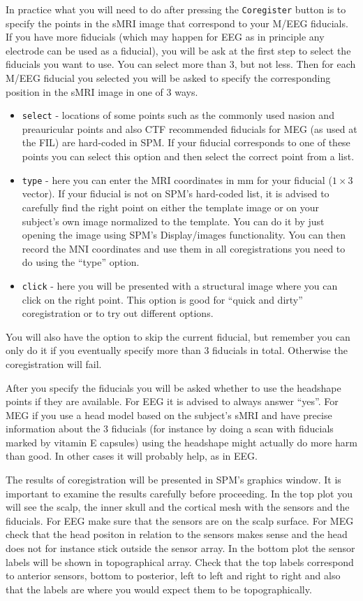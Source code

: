 In practice what you will need to do after pressing  the \texttt{Coregister} button is to specify the points in the sMRI image that correspond to your M/EEG fiducials. If you have more fiducials (which may happen for EEG as in principle any electrode can be used as a fiducial), you will be ask at the first step to select the fiducials you want to use. You can select more than 3, but not less. Then for each M/EEG fiducial you selected you will be asked to specify the corresponding position in the sMRI image in one of 3 ways.

\begin{itemize}
\item \texttt{select} - locations of some points such as the commonly used nasion and preauricular points and also CTF recommended fiducials for MEG (as used at the FIL) are hard-coded in SPM. If your fiducial corresponds to one of these points you can select this option and then select the correct point from a list.
\item \texttt{type} - here you can enter the MRI coordinates in mm for your fiducial ($1 \times 3$ vector). If your fiducial is not on SPM's hard-coded list, it is advised to carefully find the right point on either the template image or on your subject's own image normalized to the template. You can do it by just opening the image using SPM's Display/images functionality. You can then record the MNI coordinates and use them in all coregistrations you need to do using the ``type'' option.
\item \texttt{click} - here you will be presented with a structural image where you can click on the right point. This option is good for ``quick and dirty'' coregistration or to try out different options.
\end{itemize}

You will also have the option to skip the current fiducial, but remember you can only do it if you eventually specify more than 3 fiducials in total. Otherwise the coregistration will fail.

After you specify the fiducials you will be asked whether to use the headshape points if they are available. For EEG it is advised to always answer ``yes''. For MEG if you use a head model based on the subject's sMRI and have precise information about the 3 fiducials (for instance by doing a scan with fiducials marked by vitamin E capsules) using the headshape might actually do more harm than good. In other cases it will probably help, as in EEG.

The results of coregistration will be presented in SPM's graphics window. It is important to examine the results carefully before proceeding. In the top plot you will see the scalp, the inner skull and the cortical mesh with the sensors and the fiducials. For EEG make sure that the sensors are on the scalp surface. For MEG check that the head positon in relation to the sensors makes sense and the head does not for instance stick outside the sensor array. In the bottom plot the sensor labels will be shown in topographical array. Check that the top labels correspond to anterior sensors, bottom to posterior, left to left and right to right and also that the labels are where you would expect them to be topographically.

